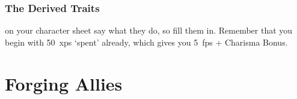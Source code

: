 \begin{multicols}{2}
\begin{multicols}{2}
\end{multicols}

\commonArmourChart

\commonWeaponsChart %
\label{commonWeapons}

\subsubsection{The Derived Traits}
on your character sheet say what they do, so fill them in.
Remember that you begin with 50~\glspl{xp} `spent' already, which gives you 5~\glspl{fp} + Charisma Bonus.

\end{multicols}

\section{Forging Allies}

\glsresetall

